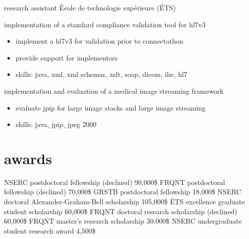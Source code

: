 \documentclass[print]{friggeri-cv}
\begin{document}
\begin{entrylist}
  {research assistant}
  {École de technologie supérieure {\scriptsize (ÉTS)}}
  {implementation of a standard compliance validation tool for hl{\small7}v{\small3}
  \begin{itemize}
    \item implement a hl{\small7}v{\small3} for validation prior to connectathon
    \item provide support for implementors
  \item skills: java, xml, xml schemas, xslt, soap, dicom, ihe, hl7
  \end{itemize}
  implementation and evaluation of a medical image streaming framework
  \begin{itemize}
    \item evaluate jpip for large image stacks and large image streaming
    \item skills: java, jpip, jpeg 2000
  \end{itemize}
  }
\end{entrylist}

\section{awards}
\begin{entrylist}
   {{\small NSERC} postdoctoral fellowship (declined)} {90,000\$} {\vspace{-3mm}}
   {{\small FRQNT} postdoctoral fellowship (declined)} {70,000\$} {\vspace{-3mm}}
   {{\small GRSTB} postdoctoral fellowship} {18,000\$} {\vspace{-3mm}}
   {{\small NSERC} doctoral Alexander-Graham-Bell scholarship} {105,000\$} {\vspace{-3mm}}
   {{\small ÉTS} excellence graduate student scholarship} {60,000\$} {\vspace{-3mm}}
   {{\small FRQNT} doctoral research scholarship (declined)} {60,000\$} {\vspace{-3mm}}
   {{\small FRQNT} master's research scholarship} {30,000\$} {\vspace{-3mm}}
   {{\small NSERC} undergraduate student research award} {4,500\$} {\vspace{-3mm}}
 \end{entrylist}
\vspace{2mm}

\end{document}
